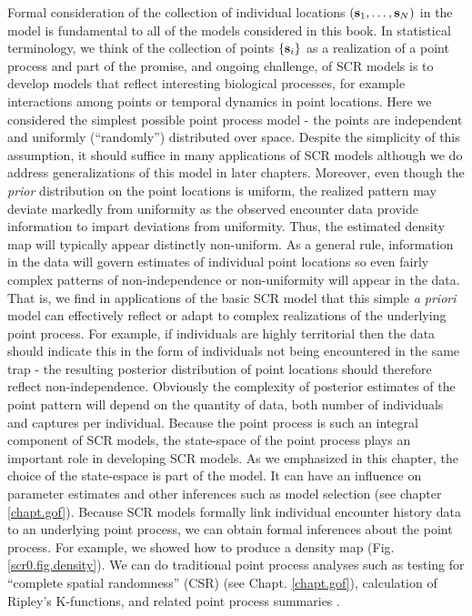 {{Formal consideration of the collection of individual locations $({\bf
  s}_{1}, \ldots, {\bf s}_{N})$ in the model is fundamental to all of
the models considered in this book. In statistical terminology, we
think of the collection of points $\{ {\bf s}_{i} \}$ as a realization of a
point process and part of the promise, and ongoing challenge, of SCR
models is to develop models that reflect interesting biological
processes, for example interactions among points or temporal dynamics
in point locations.  Here we considered the simplest possible point
process model - the points are independent and uniformly
(``randomly'') distributed over space. Despite the simplicity of this
assumption, it should suffice in many applications of SCR models
although we do address generalizations of this model in later
chapters. Moreover, even though the {\it prior} distribution on the
point locations is uniform, the realized pattern may deviate markedly
from uniformity as the observed encounter data provide information to
impart deviations from uniformity. Thus, the estimated density map
will typically appear distinctly non-uniform.  As a general rule,
information in the data will govern estimates of individual point
locations so even fairly complex patterns of non-independence or
non-uniformity will appear in the data. That is, we find in
applications of the basic SCR model that this simple {\it a priori}
model can effectively reflect or adapt to complex realizations of the
underlying point process.  For example, if individuals are highly
territorial then the data should indicate this in the form of
individuals not being encountered in the same trap - the resulting
posterior distribution of point locations should therefore reflect
non-independence.  Obviously the complexity of posterior estimates of
the point pattern will depend on the quantity of data, both number of
individuals and captures per individual.  Because the point process is
such an integral component of SCR models, the state-space of the point
process plays an important role in developing SCR models. As we 
emphasized in this chapter, the choice of the state-espace is part of
the model. It can have an influence on parameter estimates and other
inferences such as model selection (see chapter \ref{chapt.gof}).
Because SCR models formally link individual encounter history data to
an underlying point process, we can obtain formal inferences about the
point process. For example, we showed how to produce a density
map (Fig. \ref{scr0.fig.density}). We can do
traditional point process analyses such as testing for 
``complete spatial randomness'' 
(CSR) (see Chapt.  \ref{chapt.gof}),
calculation of Ripley's K-functions,
and related point process summaries \citep{illian_etal:2008}.

}}

